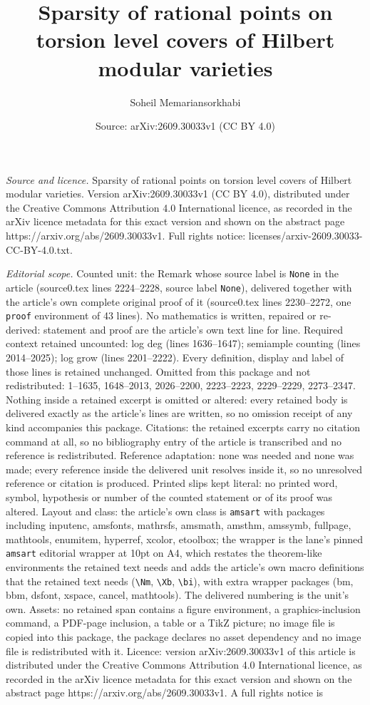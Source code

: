 \documentclass[10pt,a4paper]{amsart}
\title[Sparsity of rational points on torsion level covers of Hilbe]{Sparsity of rational points on torsion level covers of Hilbert modular varieties}
\author{Soheil Memariansorkhabi}
\date{Source: arXiv:2609.30033v1 (CC BY 4.0)}
\begin{document}
\maketitle

\noindent\emph{Source and licence.} Sparsity of rational points on torsion level covers of Hilbert modular varieties. Version arXiv:2609.30033v1 (CC BY 4.0), distributed under the Creative Commons Attribution 4.0 International licence, as recorded in the arXiv licence metadata for this exact version and shown on the abstract page https://arxiv.org/abs/2609.30033v1. Full rights notice: licenses/arxiv-2609.30033-CC-BY-4.0.txt.\par\smallskip

\noindent\textit{Editorial scope.} Counted unit: the Remark whose source label is \texttt{None} in the article (source0.tex lines 2224--2228, source label \texttt{None}), delivered together with the article's own complete original proof of it (source0.tex lines 2230--2272, one \texttt{proof} environment of 43 lines). No mathematics is written, repaired or re-derived: statement and proof are the article's own text line for line. Required context retained uncounted: log deg (lines 1636--1647); semiample counting (lines 2014--2025); log grow (lines 2201--2222). Every definition, display and label of those lines is retained unchanged. Omitted from this package and not redistributed: 1--1635, 1648--2013, 2026--2200, 2223--2223, 2229--2229, 2273--2347. Nothing inside a retained excerpt is omitted or altered: every retained body is delivered exactly as the article's lines are written, so no omission receipt of any kind accompanies this package. Citations: the retained excerpts carry no citation command at all, so no bibliography entry of the article is transcribed and no reference is redistributed. Reference adaptation: none was needed and none was made; every reference inside the delivered unit resolves inside it, so no unresolved reference or citation is produced. Printed slips kept literal: no printed word, symbol, hypothesis or number of the counted statement or of its proof was altered. Layout and class: the article's own class is \texttt{amsart} with packages including inputenc, amsfonts, mathrsfs, amsmath, amsthm, amssymb, fullpage, mathtools, enumitem, hyperref, xcolor, etoolbox; the wrapper is the lane's pinned \texttt{amsart} editorial wrapper at 10pt on A4, which restates the theorem-like environments the retained text needs and adds the article's own macro definitions that the retained text needs (\texttt{\textbackslash Nm}, \texttt{\textbackslash Xb}, \texttt{\textbackslash bi}), with extra wrapper packages (bm, bbm, dsfont, xspace, cancel, mathtools). The delivered numbering is the unit's own. Assets: no retained span contains a figure environment, a graphics-inclusion command, a PDF-page inclusion, a table or a TikZ picture; no image file is copied into this package, the package declares no asset dependency and no image file is redistributed with it. Licence: version arXiv:2609.30033v1 of this article is distributed under the Creative Commons Attribution 4.0 International licence, as recorded in the arXiv licence metadata for this exact version and shown on the abstract page https://arxiv.org/abs/2609.30033v1. A full rights notice is 
\end{document}
